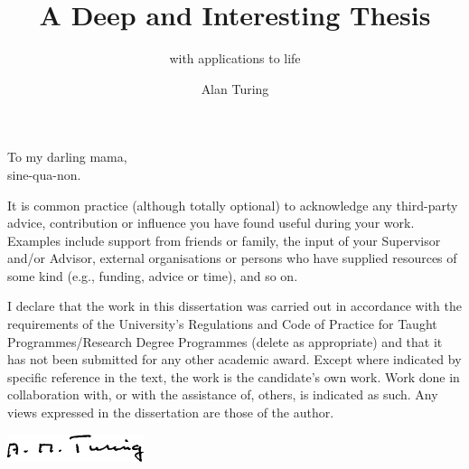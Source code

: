 \documentclass[
  bibstyle=apa, %
]{uob-thesis}
\title{A Deep and Interesting Thesis}
\subtitle{with applications to life}
\author{Alan Turing}
\date{\printdatewithoutmonth{thesisdate}}
\begin{document}

\hypersetup{pageanchor=false}
\maketitle
\cleardoubleoddemptypage

\begin{abstract}
  
\end{abstract}

\begin{dedication}
  To my darling mama,\\
  sine-qua-non.
\end{dedication}

\begin{acknowledgements}
It is common practice (although totally optional) to acknowledge any third-party
advice, contribution or influence you have found useful during your work.
Examples include support from friends or family, the input of your Supervisor
and/or Advisor, external organisations or persons who  have supplied resources
of some kind (e.g., funding, advice or time), and so on.
\end{acknowledgements}

\begin{declaration}
  I declare that the work in this dissertation was carried out in accordance
  with the requirements of the University's Regulations and Code of Practice for
  Taught Programmes/Research Degree Programmes {\color{red} (delete as
  appropriate)} and that it has not been submitted for any other academic award.
  Except where indicated by specific reference in the text, the work is the
  candidate's own work. Work done in collaboration with, or with the assistance
  of, others, is indicated as such. Any views expressed in the
  dissertation are those of the author.
  
  \vspace{2cm}

  \includegraphics[width=4cm]{sig}
\end{declaration}

\hypersetup{pageanchor=true}
\end{document}
